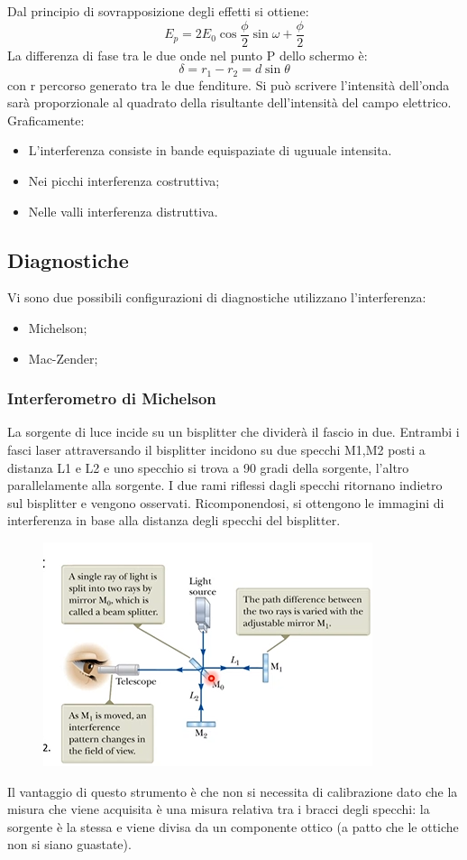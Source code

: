 \documentclass{article}
\begin{document}
Dal principio di sovrapposizione degli effetti si ottiene:\begin{equation}
	E_{p}=2E_{0}\cos{\frac{\phi}{2}}\sin{\omega+\frac{\phi}{2}}
\end{equation}
La differenza di fase tra le due onde nel punto P dello schermo è:\begin{equation}
	\delta=r_{1}-r_{2}=d\sin{\theta}
\end{equation}
con r percorso generato tra le due fenditure.
Si può scrivere l'intensità dell'onda sarà proporzionale al quadrato della risultante dell'intensità del campo elettrico. Graficamente:\begin{itemize}
	\item L'interferenza consiste in bande equispaziate di uguuale intensita.
	\item Nei picchi interferenza costruttiva;
	\item Nelle valli interferenza distruttiva.
\end{itemize}
\subsection{Diagnostiche}
Vi sono due possibili configurazioni di diagnostiche utilizzano l'interferenza:\begin{itemize}
	\item Michelson;
	\item Mac-Zender;
\end{itemize}
\subsubsection{Interferometro di Michelson}
La sorgente di luce incide su un bisplitter che dividerà il fascio in due. Entrambi i fasci laser attraversando il bisplitter incidono su due specchi M1,M2 posti a distanza L1 e L2 e uno specchio si trova a 90 gradi della sorgente, l'altro parallelamente alla sorgente.\newline
I due rami riflessi dagli specchi ritornano indietro sul bisplitter e vengono osservati. Ricomponendosi, si ottengono le immagini di interferenza in base alla distanza degli specchi del bisplitter.
\begin{figure}[h]
	\includegraphics[scale=0.4]{2022-05-29-15-59-34.png}%
\end{figure}
Il vantaggio di questo strumento è che non si necessita di calibrazione dato che la misura che viene acquisita è una misura relativa tra i bracci degli specchi: la sorgente è la stessa e viene divisa da un componente ottico (a patto che le ottiche non si siano guastate).
\end{document}
